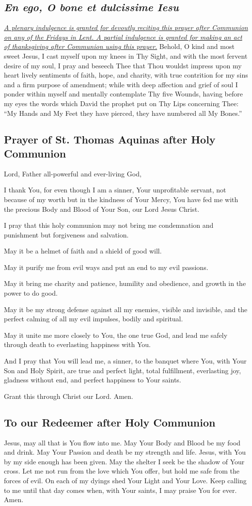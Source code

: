 \documentclass[12pt]{article}
\newcommand{\prayertitle}[1]{\subsection{#1}}
\newcommand{\indulgencedprayertitle}[1]{\prayertitle{#1 \protect\kreuz}}
\newcommand{\emphasis}[1]{\emph{#1}}
\newcommand{\emphasis}[1]{\textsl{#1}}
\newcommand{\foreign}[1]{\emphasis{#1}}
\newcommand{\note}[1]{{\small{\emphasis{#1}}}\newline}
\newcommand{\linkednote}[2]{\hyperlink{#1}{\note{#2}}}
\begin{document}
\indulgencedprayertitle{\foreign{En ego, O bone et dulcissime Iesu}}
\linkednote{grant8}{A plenary indulgence is granted for devoutly reciting this prayer after Communion on any of the Fridays in Lent. A partial indulgence is granted for making an act of thanksgiving after Communion using this prayer.}
Behold, O kind and most sweet Jesus, I cast myself upon my knees in Thy Sight, and with the most fervent desire of my soul, I pray and beseech Thee that Thou wouldst impress upon my heart lively sentiments of faith, hope, and charity, with true contrition for my sins and a firm purpose of amendment;
while with deep affection and grief of soul I ponder within myself and mentally contemplate Thy five Wounds, having before my eyes the words which David the prophet put on Thy Lips concerning Thee:
``My Hands and My Feet they have pierced, they have numbered all My Bones.''

\prayertitle{Prayer of St. Thomas Aquinas after Holy Communion}
Lord, Father all-powerful and ever-living God,

I thank You, for even though I am a sinner, Your unprofitable servant, not because of my worth but in the kindness of Your Mercy, You have fed me with the precious Body and Blood of Your Son, our Lord Jesus Christ.

I pray that this holy communion may not bring me condemnation and punishment but forgiveness and salvation.

May it be a helmet of faith and a shield of good will.

May it purify me from evil ways and put an end to my evil passions.

May it bring me charity and patience, humility and obedience, and growth in the power to do good.

May it be my strong defense against all my enemies, visible and invisible, and the perfect calming of all my evil impulses, bodily and spiritual.

May it unite me more closely to You, the one true God, and lead me safely through death to everlasting happiness with You.

And I pray that You will lead me, a sinner, to the banquet where You, with Your Son and Holy Spirit, are true and perfect light, total fulfillment, everlasting joy, gladness without end, and perfect happiness to Your saints.

Grant this through Christ our Lord. Amen.

\prayertitle{To our Redeemer after Holy Communion}
Jesus, may all that is You flow into me.
May Your Body and Blood be my food and drink.
May Your Passion and death be my strength and life.
Jesus, with You by my side enough has been given.
May the shelter I seek be the shadow of Your cross.
Let me not run from the love which You offer, but hold me safe from the forces of evil.
On each of my dyings shed Your Light and Your Love.
Keep calling to me until that day comes when, with Your saints, I may praise You for ever.
Amen.
\end{document}
